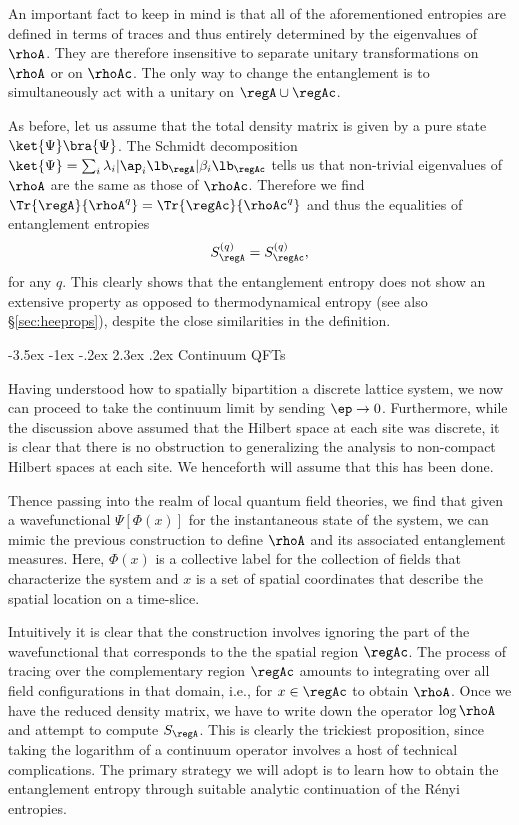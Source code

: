 \documentclass[12pt,openany]{book}
\makeatletter
\renewcommand\section{\@startsection {section}{1}{\z@}%
                                   {-3.5ex \@plus -1ex \@minus -.2ex}%
                                   {2.3ex \@plus.2ex}%
                                   {\normalfont\large\bfseries}}
\makeatother
\begin{document}
An important fact to keep in mind is that all of the aforementioned entropies are defined in terms of traces and thus entirely  determined by the eigenvalues of $\rhoA$. They  are therefore insensitive to separate unitary transformations on $\rhoA$ or on $\rhoAc$. The only way to change the entanglement is to simultaneously act with a unitary on $\regA \cup \regAc$.

As before, let us assume that the total density matrix is given by a pure state $\ket{\Psi} \bra{\Psi}$. The Schmidt decomposition $\ket{\Psi} =\sum_{i}\lambda_i |\ap_i\lb_{\regA}|\beta_i\lb_{\regAc}$ tells us that non-trivial eigenvalues of $\rhoA$ are the same as those of $\rhoAc$. Therefore we find
$\Tr{\regA}{\rhoA^q}=\Tr{\regAc}{\rhoAc^q}$ and thus the equalities of entanglement entropies
%
\begin{equation}
S^{(q)}_{\regA}=S^{(q)}_{\regAc},
\end{equation}
%
for any $q$. This clearly shows that the entanglement entropy does not show an extensive property as opposed to thermodynamical entropy (see also \S\ref{sec:heeprops}), despite the close similarities in the definition.



\section{Continuum QFTs}
\label{sec:eeqft}

Having understood how to spatially bipartition a discrete lattice system, we now can proceed to take the continuum limit by sending $\ep \to 0$.  Furthermore, while the discussion above assumed that the Hilbert space at each site was discrete, it is clear that there is no obstruction to generalizing the analysis to non-compact Hilbert spaces at each site. We henceforth will assume that this has been done.

Thence passing into the realm of local quantum field theories, we find that given a wavefunctional $\Psi[\Phi(x)]$ for the instantaneous state of the system, we can mimic the previous construction to define $\rhoA$ and its associated entanglement measures.
Here, $\Phi(x)$ is a collective label for the collection of fields that characterize the system and
$x$ is a set of  spatial coordinates that describe the spatial location on a time-slice.

Intuitively it is clear that the construction involves ignoring the part of the wavefunctional that corresponds to the the spatial region $\regAc$. The process of tracing over the complementary region $\regAc$ amounts to integrating over all field configurations in that domain, i.e., for $x\in \regAc$ to obtain $\rhoA$. Once we have the reduced density matrix, we have to write down
the operator $\log \rhoA$ and attempt to compute $S_\regA$. This is clearly the trickiest proposition, since taking the logarithm of a continuum operator involves a host of technical complications. The primary strategy we will adopt is to learn how to  obtain the entanglement entropy through suitable analytic continuation of the R\'enyi entropies.
\end{document}
